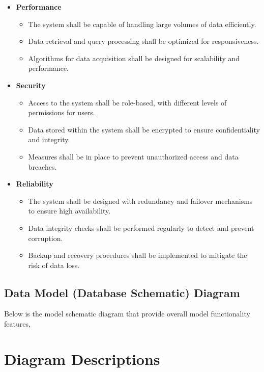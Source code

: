 \begin{itemize}
    \item \textbf{Performance}
    \begin{itemize}
        \item The system shall be capable of handling large volumes of data efficiently.
        \item Data retrieval and query processing shall be optimized for responsiveness.
        \item Algorithms for data acquisition shall be designed for scalability and performance.
    \end{itemize}
    \item \textbf{Security}
    \begin{itemize}
        \item Access to the system shall be role-based, with different levels of permissions for users.
        \item Data stored within the system shall be encrypted to ensure confidentiality and integrity.
        \item Measures shall be in place to prevent unauthorized access and data breaches.
    \end{itemize}
    \item \textbf{Reliability}
    \begin{itemize}
        \item The system shall be designed with redundancy and failover mechanisms to ensure high availability.
        \item Data integrity checks shall be performed regularly to detect and prevent corruption.
        \item Backup and recovery procedures shall be implemented to mitigate the risk of data loss.
    \end{itemize}
\end{itemize}
\subsection{Data Model (Database Schematic) Diagram}
Below is the model schematic diagram that provide overall model functionality features, 

\section*{Diagram Descriptions}


